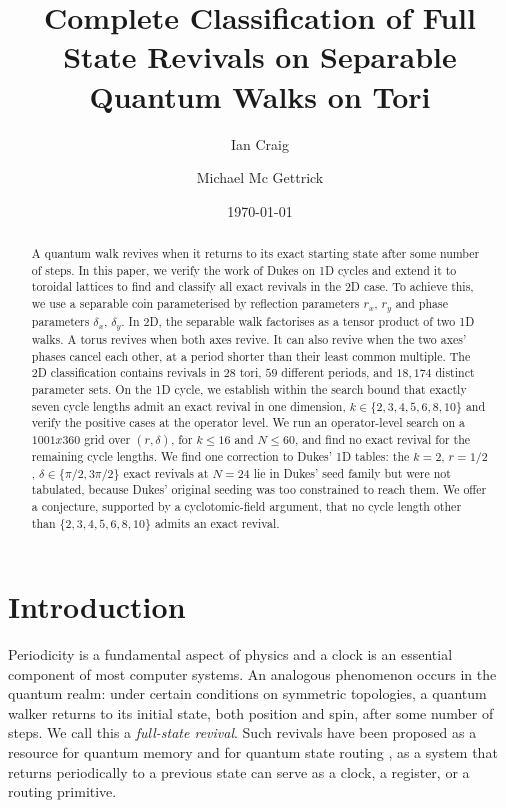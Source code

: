 \documentclass[aps,pra,reprint,amsmath,amssymb,superscriptaddress,floatfix]{revtex4-2}
\def\times{x}%
\def\rho{r}%
\begin{document}
\title{Complete Classification of Full State Revivals on Separable Quantum Walks on Tori}\author{Ian Craig}\author{Michael Mc Gettrick}\date{\today}
\begin{abstract}A quantum walk revives when it returns to its exact starting state
after some number of steps. In this paper, we verify the work of
Dukes on 1D cycles and extend it to toroidal lattices to find and classify
all exact revivals in the 2D case. To achieve this, we use a separable coin
parameterised by reflection parameters $\rho_x$, $\rho_y$ and phase parameters
$\delta_x$, $\delta_y$.
In 2D, the separable walk factorises as a tensor
product of two 1D walks. A torus revives when both axes revive.
It can also revive when the two axes' phases cancel each other,
at a period shorter than their least common multiple.
The 2D classification contains revivals in
$28$ tori, $59$ different periods, and $18{,}174$
distinct parameter sets.
On the 1D cycle, we establish within the search bound that exactly seven
cycle lengths admit an exact revival in one dimension,
$k \in \{2, 3, 4, 5, 6, 8, 10\}$ and verify the positive cases at the operator level.
We run an operator-level search on a
$1001 \times 360$ grid over $(\rho, \delta)$, for $k \le 16$ and
$N \le 60$, and find no exact revival for the remaining cycle lengths.
We find one correction to Dukes' 1D tables: the $k = 2$, $\rho = 1/2$,
$\delta \in \{\pi/2, 3\pi/2\}$ exact revivals at $N = 24$
lie in Dukes' seed family but were not tabulated, because Dukes' original
seeding was too constrained to reach them.  We offer a
conjecture, supported by a cyclotomic-field argument, that no cycle
length other than $\{2, 3, 4, 5, 6, 8, 10\}$ admits an exact revival.

\end{abstract}

\maketitle\section{\label{sec:intro}Introduction}\par
Periodicity is a fundamental aspect of physics and a clock is an
essential component of most computer systems. An analogous phenomenon
occurs in the quantum realm: under certain conditions on symmetric
topologies, a quantum walker returns to its initial state, both
position and spin, after some number of steps. We call this a
\emph{full-state revival}. Such revivals have been proposed as a
resource for quantum memory \cite{Chandrashekar2015} and for quantum
state routing \cite{Steinfurth2025}, as a system that returns
periodically to a previous state can serve as a clock, a register, or
a routing primitive.
\end{document}
